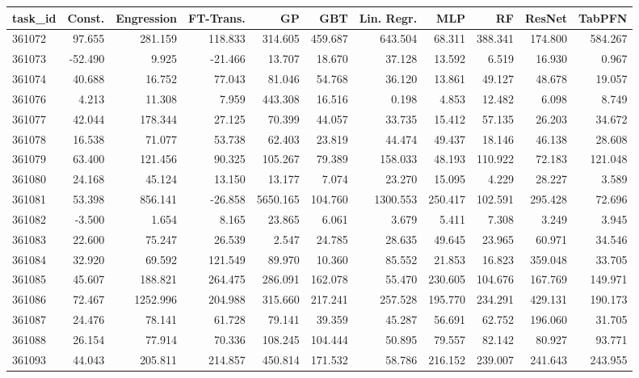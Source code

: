 \begin{tabular}{lrrrrrrrrrr}
\toprule
task\_id & Const. & Engression & FT-Trans. & GP & GBT & Lin. Regr. & MLP & RF & ResNet & TabPFN \\
\midrule
361072 & 97.655 & 281.159 & 118.833 & 314.605 & 459.687 & 643.504 & 68.311 & 388.341 & 174.800 & 584.267 \\
361073 & -52.490 & 9.925 & -21.466 & 13.707 & 18.670 & 37.128 & 13.592 & 6.519 & 16.930 & 0.967 \\
361074 & 40.688 & 16.752 & 77.043 & 81.046 & 54.768 & 36.120 & 13.861 & 49.127 & 48.678 & 19.057 \\
361076 & 4.213 & 11.308 & 7.959 & 443.308 & 16.516 & 0.198 & 4.853 & 12.482 & 6.098 & 8.749 \\
361077 & 42.044 & 178.344 & 27.125 & 70.399 & 44.057 & 33.735 & 15.412 & 57.135 & 26.203 & 34.672 \\
361078 & 16.538 & 71.077 & 53.738 & 62.403 & 23.819 & 44.474 & 49.437 & 18.146 & 46.138 & 28.608 \\
361079 & 63.400 & 121.456 & 90.325 & 105.267 & 79.389 & 158.033 & 48.193 & 110.922 & 72.183 & 121.048 \\
361080 & 24.168 & 45.124 & 13.150 & 13.177 & 7.074 & 23.270 & 15.095 & 4.229 & 28.227 & 3.589 \\
361081 & 53.398 & 856.141 & -26.858 & 5650.165 & 104.760 & 1300.553 & 250.417 & 102.591 & 295.428 & 72.696 \\
361082 & -3.500 & 1.654 & 8.165 & 23.865 & 6.061 & 3.679 & 5.411 & 7.308 & 3.249 & 3.945 \\
361083 & 22.600 & 75.247 & 26.539 & 2.547 & 24.785 & 28.635 & 49.645 & 23.965 & 60.971 & 34.546 \\
361084 & 32.920 & 69.592 & 121.549 & 89.970 & 10.360 & 85.552 & 21.853 & 16.823 & 359.048 & 33.705 \\
361085 & 45.607 & 188.821 & 264.475 & 286.091 & 162.078 & 55.470 & 230.605 & 104.676 & 167.769 & 149.971 \\
361086 & 72.467 & 1252.996 & 204.988 & 315.660 & 217.241 & 257.528 & 195.770 & 234.291 & 429.131 & 190.173 \\
361087 & 24.476 & 78.141 & 61.728 & 79.141 & 39.359 & 45.287 & 56.691 & 62.752 & 196.060 & 31.705 \\
361088 & 26.154 & 77.914 & 70.336 & 108.245 & 104.444 & 50.895 & 79.557 & 82.142 & 80.927 & 93.771 \\
361093 & 44.043 & 205.811 & 214.857 & 450.814 & 171.532 & 58.786 & 216.152 & 239.007 & 241.643 & 243.955 \\

\end{tabular}
